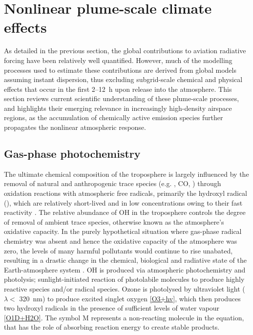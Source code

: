 \section{Nonlinear plume-scale climate effects}
As detailed in the previous section, the global contributions to aviation radiative forcing have been relatively well quantified. However, much of the modelling processes used to estimate these contributions are derived from global models assuming instant dispersion, thus excluding subgrid-scale chemical and physical effects that occur in the first 2--12~h upon release into the atmosphere. This section reviews current scientific understanding of these plume-scale processes, and highlights their emerging relevance in increasingly high-density airspace regions, as the accumulation of chemically active emission species further propagates the nonlinear atmospheric response.

\subsection{Gas-phase photochemistry}
\label{Gas-phase_photochem}
The ultimate chemical composition of the troposphere is largely influenced by the removal of natural and anthropogenic trace species (e.g. , CO, ) through oxidation reactions with atmospheric free radicals, primarily the hydroxyl radical (), which are relatively short-lived and in low concentrations owing to their fast reactivity \cite{Stone2012, Monks2005}. The relative abundance of OH in the troposphere controls the degree of removal of ambient trace species, otherwise known as the atmosphere's oxidative capacity. In the purely hypothetical situation where gas-phase radical chemistry was absent and hence the oxidative capacity of the atmosphere was zero, the levels of many harmful pollutants would continue to rise unabated, resulting in a drastic change in the chemical, biological and radiative state of the Earth-atmosphere system \cite{Prinn2003}. OH is produced via atmospheric photochemistry and photolysis; sunlight-initiated reaction of photolabile molecules to produce highly reactive species and/or radical species. Ozone is photolysed by ultraviolet light ($\lambda <$ 320~nm) to produce excited singlet oxygen  \eqref{O3+hv}, which then produces two hydroxyl radicals in the presence of sufficient levels of water vapour \eqref{O1D+H2O}. The symbol M represents a non-reacting molecule in the equation, that has the role of absorbing reaction energy to create stable products.

